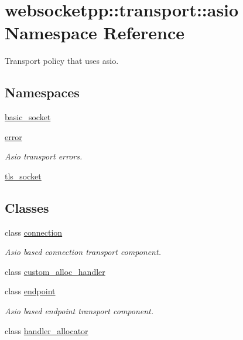 \hypertarget{namespacewebsocketpp_1_1transport_1_1asio}{}\section{websocketpp\+:\+:transport\+:\+:asio Namespace Reference}
\label{namespacewebsocketpp_1_1transport_1_1asio}


Transport policy that uses asio.  


\subsection*{Namespaces}
\begin{DoxyCompactItemize}
\item 
 \mbox{\hyperlink{namespacewebsocketpp_1_1transport_1_1asio_1_1basic__socket}{basic\+\_\+socket}}
\item 
 \mbox{\hyperlink{namespacewebsocketpp_1_1transport_1_1asio_1_1error}{error}}
\begin{DoxyCompactList}\small\item\em Asio transport errors. \end{DoxyCompactList}\item 
 \mbox{\hyperlink{namespacewebsocketpp_1_1transport_1_1asio_1_1tls__socket}{tls\+\_\+socket}}
\end{DoxyCompactItemize}
\subsection*{Classes}
\begin{DoxyCompactItemize}
\item 
class \mbox{\hyperlink{classwebsocketpp_1_1transport_1_1asio_1_1connection}{connection}}
\begin{DoxyCompactList}\small\item\em Asio based connection transport component. \end{DoxyCompactList}\item 
class \mbox{\hyperlink{classwebsocketpp_1_1transport_1_1asio_1_1custom__alloc__handler}{custom\+\_\+alloc\+\_\+handler}}
\item 
class \mbox{\hyperlink{classwebsocketpp_1_1transport_1_1asio_1_1endpoint}{endpoint}}
\begin{DoxyCompactList}\small\item\em Asio based endpoint transport component. \end{DoxyCompactList}\item 
class \mbox{\hyperlink{classwebsocketpp_1_1transport_1_1asio_1_1handler__allocator}{handler\+\_\+allocator}}
\end{DoxyCompactItemize}
